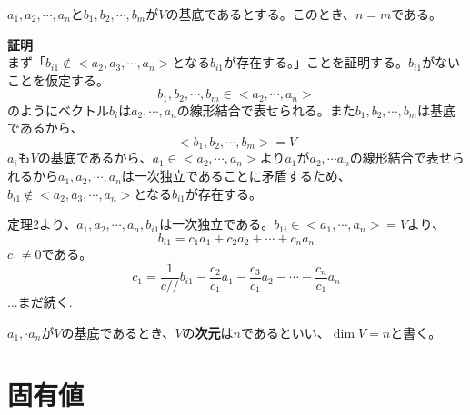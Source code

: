 \documentclass{jlreq}
\begin{document}
\begin{theorembox}[定理4]
  $a_1, a_2, \cdots, a_n$と$b_1, b_2, \cdots, b_m$が$V$の基底であるとする。このとき、$n = m$である。

  \dotfill

  \textbf{証明} \\

  まず「$b_{i1} \notin <a_2, a_3, \cdots, a_n>$となる$b_{i1}$が存在する。」ことを証明する。$b_{i1}$がないことを仮定する。
  \begin{equation*}
    b_1, b_2, \cdots, b_m \in <a_2, \cdots, a_n>
  \end{equation*}
  のようにベクトル$b_i$は$a_2, \cdots, a_n$の線形結合で表せられる。また$b_1, b_2, \cdots, b_m$は基底であるから、
  \begin{equation*}
    <b_1, b_2, \cdots, b_m> = V
  \end{equation*}
  $a_i$も$V$の基底であるから、$a_1 \in <a_2, \cdots, a_n>$より$a_1$が$a_2, \cdots a_n$の線形結合で表せられるから$a_1, a_2, \cdots, a_n$は一次独立であることに矛盾するため、$b_{i1} \notin <a_2, a_3, \cdots, a_n>$となる$b_{i1}$が存在する。

  定理2より、$a_1, a_2, \cdots, a_n, b_{i1}$は一次独立である。$b_{1i} \in <a_1, \cdots, a_n> = V$より、
  \begin{equation*}
    b_{i1} = c_1 a_1 + c_2 a_2 + \cdots + c_n a_n
  \end{equation*}
  $c_1 \neq 0$である。
  \begin{equation*}
    c_1 = \frac{1}{c//} b_{i1} - \frac{c_2}{c_1} a_1 - \frac{c_3}{c_1} a_2 - \cdots - \frac{c_n}{c_1} a_n
  \end{equation*}
  ...まだ続く. 
\end{theorembox}

\begin{definitionbox}[次元]
  $a_1, \cdot a_n$が$V$の基底であるとき、$V$の\textbf{次元}は$n$であるといい、$\dim V = n$と書く。
\end{definitionbox}



\section{固有値}
\end{document}
